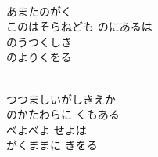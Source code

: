 \documentclass[10pt,b5j]{tarticle} %
\begin{document}
\begin{enumerate}
\begin{minipage}[c]{\blocksize}
    \end{minipage}
    \begin{minipage}[c]{\blocksize}
        
        \vspace{\linespace}
        \item~\\
        あまたのがく\\
        このはそらねども
        のにあるは\\
        のうつくしき\\
        のよりくをる
        
        \vspace{\linespace}
        \item~\\
        つつましいがしきえか\\
        のかたわらに
        くもある\\
        べよべよ
        せよは\\
        がくままに
        きをる
    
    \end{minipage}
\end{enumerate} %
\end{document}
